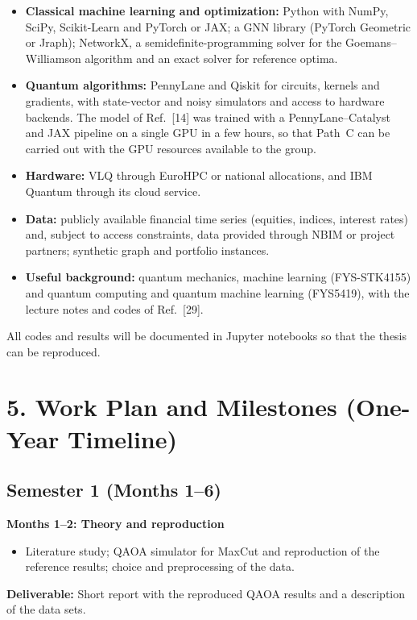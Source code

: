 \documentclass[12pt,a4paper]{article}
\begin{document}
\begin{itemize}
  \item \textbf{Classical machine learning and optimization:} Python
  with NumPy, SciPy, Scikit-Learn and PyTorch or JAX; a GNN library
  (PyTorch Geometric or Jraph); NetworkX, a semidefinite-programming
  solver for the Goemans--Williamson algorithm and an exact solver for
  reference optima.
  \item \textbf{Quantum algorithms:} PennyLane and Qiskit for
  circuits, kernels and gradients, with state-vector and noisy
  simulators and access to hardware backends.  The model of Ref.~[14]
  was trained with a PennyLane--Catalyst and JAX pipeline on a single
  GPU in a few hours, so that Path~C can be carried out with the GPU
  resources available to the group.
  \item \textbf{Hardware:} VLQ through EuroHPC or national
  allocations, and IBM Quantum through its cloud service.
  \item \textbf{Data:} publicly available financial time series
  (equities, indices, interest rates) and, subject to access
  constraints, data provided through NBIM or project partners;
  synthetic graph and portfolio instances.
  \item \textbf{Useful background:} quantum mechanics, machine
  learning (FYS-STK4155) and quantum computing and quantum machine
  learning (FYS5419), with the lecture notes and codes of Ref.~[29].
\end{itemize}
All codes and results will be documented in Jupyter notebooks so that
the thesis can be reproduced.

\section*{5. Work Plan and Milestones (One-Year Timeline)}

\subsection*{Semester 1 (Months 1--6)}

\textbf{Months 1--2: Theory and reproduction}
\begin{itemize}
    \item Literature study; QAOA simulator for MaxCut and reproduction
    of the reference results; choice and preprocessing of the data.
\end{itemize}
\textbf{Deliverable:} Short report with the reproduced QAOA results
and a description of the data sets.
\end{document}
